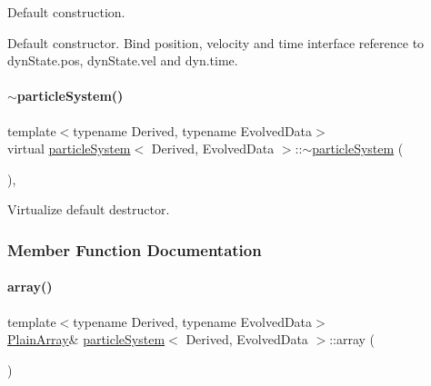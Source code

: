 Default construction. 

Default constructor. Bind position, velocity and time interface reference to dyn\+State.\+pos, dyn\+State.\+vel and dyn.\+time. \mbox{\label{classparticle_system_a14ddda3c186e335eb989790db240dd94}} 
\paragraph{\texorpdfstring{$\sim$particle\+System()}{~particleSystem()}}
{\footnotesize\ttfamily template$<$typename Derived, typename Evolved\+Data$>$ \\
virtual \mbox{\hyperlink{classparticle_system}{particle\+System}}$<$ Derived, Evolved\+Data $>$\+::$\sim$\mbox{\hyperlink{classparticle_system}{particle\+System}} (\begin{DoxyParamCaption}{ }\end{DoxyParamCaption})\hspace{0.3cm}{\ttfamily [inline]}, {\ttfamily [virtual]}}



Virtualize default destructor. 



\subsubsection{Member Function Documentation}
\mbox{\label{classparticle_system_a1817956f802188c82c12c223c32bd28a}} 
\paragraph{\texorpdfstring{array()}{array()}}
{\footnotesize\ttfamily template$<$typename Derived, typename Evolved\+Data$>$ \\
\mbox{\hyperlink{classparticle_system_ae5a7215810a9f2cad5508aca6b26a063}{Plain\+Array}}\& \mbox{\hyperlink{classparticle_system}{particle\+System}}$<$ Derived, Evolved\+Data $>$\+::array (\begin{DoxyParamCaption}{ }\end{DoxyParamCaption})\hspace{0.3cm}{\ttfamily [inline]}}



